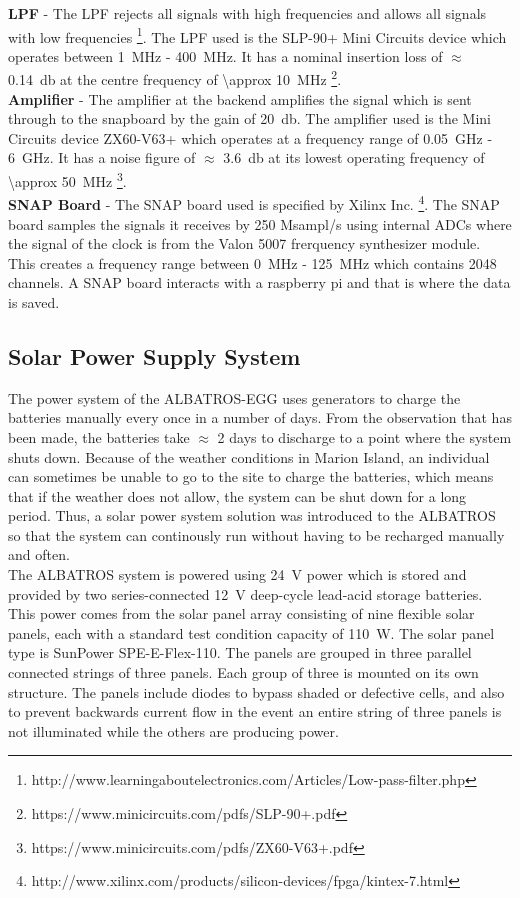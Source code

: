 \documentclass{ws-jai}
\begin{document}
\textbf{LPF} - The LPF rejects all signals with high frequencies and allows all signals with low frequencies \footnote{http://www.learningaboutelectronics.com/Articles/Low-pass-filter.php}. The LPF used is the SLP-90+ Mini Circuits device which operates between \SI{1}{MHz} - \SI{400}{MHz}. It has a nominal insertion loss of $\approx$ \SI{0.14}{\decibel} at the centre frequency of  \SI{\approx 10}{MHz} \footnote{https://www.minicircuits.com/pdfs/SLP-90+.pdf}.\\

\textbf{Amplifier} - The amplifier at the backend amplifies the signal which is sent through to the snapboard by the gain of \SI{+20}{\decibel}. The amplifier used is the Mini Circuits device ZX60-V63+ which operates at a frequency range of \SI{0.05}{GHz} - \SI{6}{GHz}. It has a noise figure of $\approx$ \SI{3.6}{\decibel} at its lowest operating frequency of \SI{\approx 50}{MHz} \footnote{https://www.minicircuits.com/pdfs/ZX60-V63+.pdf}.\\

\textbf{SNAP Board} - The SNAP board used is specified by Xilinx Inc. \footnote{http://www.xilinx.com/products/silicon-devices/fpga/kintex-7.html}. The  SNAP board samples the signals it receives by 250 Msampl/s using internal ADCs where the signal of the clock is from the Valon 5007 frerquency synthesizer module. This creates a frequency range between \SI{0}{MHz} - \SI{125}{MHz} which contains 2048 channels. A SNAP board interacts with a raspberry pi and that is where the data is saved.\\

\subsection{Solar Power Supply System}
The power system of the ALBATROS-EGG uses generators to charge the batteries manually every once in a number of days. From the observation that has been made, the batteries take $\approx$ 2 days to discharge to a point where the system shuts down. Because of the weather conditions in Marion Island, an individual can sometimes be unable to go to the site to charge the batteries, which means that if the weather does not allow, the system can be shut down for a long period. Thus, a solar power system solution was introduced to the ALBATROS so that the system can continously run without having to be recharged manually and often.\\

The ALBATROS system is powered using \SI{24}{\volt} power which is stored and provided by two series-connected \SI{12}{\volt} deep-cycle lead-acid storage batteries. This power comes from the solar panel array consisting of nine flexible solar panels, each with a standard test condition capacity of \SI{110}{\watt}. The solar panel type is SunPower SPE-E-Flex-110. The panels are grouped in three parallel connected strings of three panels. Each group of three is mounted on its own structure. The panels include diodes to bypass shaded or defective cells, and also to prevent backwards current flow in the event an entire string of three panels is not illuminated while the others are producing power. \\
\end{document}
